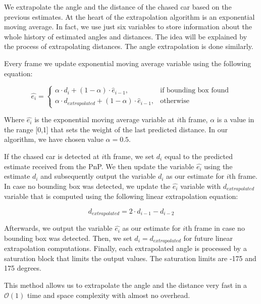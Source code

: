 \documentclass{ctuthesis/ctuthesis}
\begin{document}
We extrapolate the angle and the distance of the chased car based on the previous estimates. At the heart of the extrapolation algorithm is an exponential moving average. In fact, we use just six variables to store information about the whole history of estimated angles and distances. The idea will be explained by the process of extrapolating distances. The angle extrapolation is done similarly. \par


Every frame we update exponential moving average variable using the following equation:\par


\begin{equation}
    \hat{e_{i}}=
    \begin{cases}
      \alpha\cdot d_i + (1-\alpha)\cdot \hat{e}_{i-1}, & \text{if bounding box found} \\
      \alpha\cdot d_{extrapolated} + (1-\alpha)\cdot \hat{e}_{i-1}, & \text{otherwise}
    \end{cases}
\end{equation}

Where $\hat{e_{i}}$ is the exponential moving average variable at $i$th frame, $\alpha$ is a value in the range [0,1] that sets the weight of the last predicted distance. In our algorithm, we have chosen value $\alpha=0.5$. \par

If the chased car is detected at $i$th frame, we set $d_i$ equal to the predicted estimate received from the PnP. We then update the variable $\hat{e_{i}}$ using the estimate $d_i$ and subsequently output the variable $d_i$ as our estimate for $i$th frame. In case no bounding box was detected, we update the $\hat{e_{i}}$ variable with $d_{extrapolated}$ variable that is computed using the following linear extrapolation equation:


\begin{equation}
d_{extrapolated} = 2\cdot d_{i-1} - d_{i-2}
\end{equation}

Afterwards, we output the variable $\hat{e_{i}}$ as our estimate for $i$th frame in case no bounding box was detected. Then, we set $d_i = d_{extrapolated}$ for future linear extrapolation computations. Finally, each extrapolated angle is processed by a saturation block that limits the output values. The saturation limits are -175 and 175 degrees. \par


This method allows us to extrapolate the angle and the distance very fast in a $\mathcal{O}(1)$ time and space complexity with almost no overhead.
\end{document}
